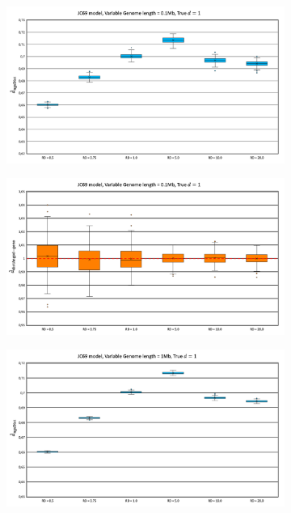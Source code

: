 \documentclass{article}
\begin{document}
\begin{figure}[h]
    \centering
        \begin{subfigure}[b]{0.475\textwidth}
         \centering
         \includegraphics[width=\textwidth]{NGSdist01Mb.png}
         \caption{}
         \label{fig:NGSdistRD01Mb}
     \end{subfigure}
     \begin{subfigure}[b]{0.475\textwidth}
         \centering
         \includegraphics[width=\textwidth]{distAngsd-geno01Mb.png}
         \caption{}
         \label{fig:distAngsd-genoRD01Mb}
     \end{subfigure}
        \begin{subfigure}[b]{0.475\textwidth}
         \centering
         \includegraphics[width=\textwidth]{NGSdist.png}

\end{subfigure}
\end{figure}
\end{document}
